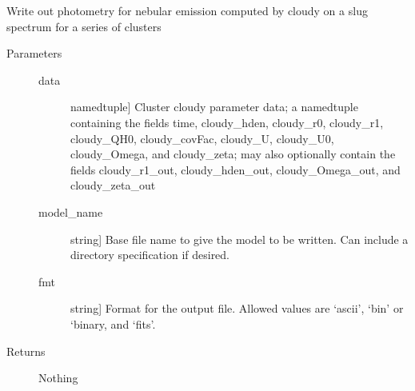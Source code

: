\documentclass[letterpaper,10pt,english]{sphinxmanual}
\begin{document}
\begin{fulllineitems}
\label{\detokenize{cloudy:slugpy.cloudy.write_integrated_cloudyparams}}
Write out photometry for nebular emission computed by cloudy on a
slug spectrum for a series of clusters
\begin{description}
\item[{Parameters}] \leavevmode\begin{description}
\item[{data}] \leavevmode{[}namedtuple{]}
Cluster cloudy parameter data; a namedtuple containing the
fields time, cloudy\_hden, cloudy\_r0, cloudy\_r1, 
cloudy\_QH0, cloudy\_covFac, cloudy\_U, cloudy\_U0, cloudy\_Omega, and
cloudy\_zeta; may also optionally contain the fields
cloudy\_r1\_out, cloudy\_hden\_out, cloudy\_Omega\_out, and
cloudy\_zeta\_out

\item[{model\_name}] \leavevmode{[}string{]}
Base file name to give the model to be written. Can include a
directory specification if desired.

\item[{fmt}] \leavevmode{[}string{]}
Format for the output file. Allowed values are ‘ascii’, ‘bin’
or ‘binary, and ‘fits’.

\end{description}

\item[{Returns}] \leavevmode
Nothing

\end{description}

\end{fulllineitems}

\end{document}
